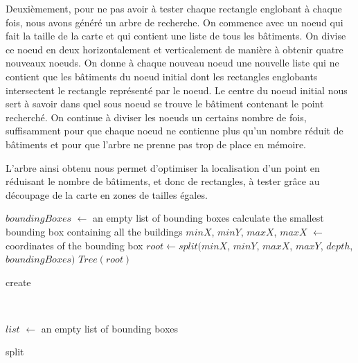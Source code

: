 Deuxièmement, pour ne pas avoir à tester chaque rectangle englobant à chaque fois, nous avons généré un arbre de recherche. On commence avec un noeud qui fait la taille de la carte et qui contient une liste de tous les bâtiments. On divise ce noeud en deux horizontalement et verticalement de manière à obtenir quatre nouveaux noeuds. On donne à chaque nouveau noeud une nouvelle liste qui ne contient que les bâtiments du noeud initial dont les rectangles englobants intersectent le rectangle représenté par le noeud. Le centre du noeud initial nous sert à savoir dans quel sous noeud se trouve le bâtiment contenant le point recherché. On continue à diviser les noeuds un certains nombre de fois, suffisamment pour que chaque noeud ne contienne plus qu'un nombre réduit de bâtiments et pour que l'arbre ne prenne pas trop de place en mémoire.

L'arbre ainsi obtenu nous permet d'optimiser la localisation d'un point en réduisant le nombre de bâtiments, et donc de rectangles, à tester grâce au découpage de la carte en zones de tailles égales.\\

\begin{algorithm}[H]
$boundingBoxes$ $\gets$ an empty list of bounding boxes\;
calculate the smallest bounding box containing all the buildings\;
$minX$, $minY$, $maxX$, $maxX$ $\gets$ coordinates of the bounding box\;
$root \gets split(minX$, $minY$, $maxX$, $maxY$, $depth$, $boundingBoxes)$\;
\Return $Tree(root)$\;
 \caption{create\label{algoarbre}}
\end{algorithm}
~\\
\begin{algorithm}[H]
$list$ $\gets$ an empty list of bounding boxes\;
  
 \caption{split}
\end{algorithm}